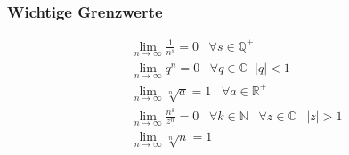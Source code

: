 \documentclass[8pt, a4paper, landscape, fleqn]{scrartcl}
\begin{document}
\begin{multicols*}{3}
				\subsubsection{Wichtige Grenzwerte}
					\vspace{-10pt}
					\begin{align*}
						&\lim_{n\rightarrow \infty} \frac{1}{n^s}=0\hspace{10pt} \forall s\in \mathbb{Q^+} \hspace{5pt}\\
						&\lim_{n\rightarrow \infty} q^n=0 \hspace{10pt} \forall q\in \mathbb{C}\hspace{7pt} \vert q\vert <1\\					
						&\lim_{n\rightarrow \infty} \sqrt[n]{a}=1 \hspace{10pt} \forall a\in \mathbb{R^+} \hspace{5pt}\\
						&\lim_{n\rightarrow \infty} \frac{n^k}{z^n}=0 \hspace{10pt} \forall k \in \mathbb{N} \hspace{10pt} \forall z\in \mathbb{C} \hspace{10pt} \vert z\vert > 1\\						
						&\lim_{n\rightarrow \infty} \sqrt[n]{n}=1
					\end{align*}	

\end{multicols*}
\end{document}
